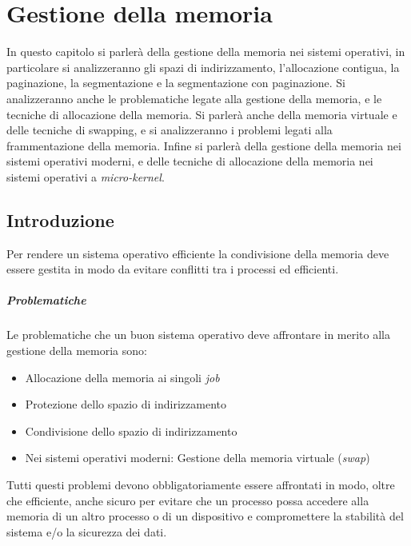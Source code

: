 \chapter{Gestione della memoria}

In questo capitolo si parlerà della gestione della memoria nei sistemi operativi, in particolare si analizzeranno gli spazi di indirizzamento, l'allocazione contigua, la paginazione, la segmentazione e la segmentazione con paginazione. Si analizzeranno anche le problematiche legate alla gestione della memoria, e le tecniche di allocazione della memoria. Si parlerà anche della memoria virtuale e delle tecniche di swapping, e si analizzeranno i problemi legati alla frammentazione della memoria. Infine si parlerà della gestione della memoria nei sistemi operativi moderni, e delle tecniche di allocazione della memoria nei sistemi operativi a \textit{micro-kernel}.

\section{Introduzione}
    Per rendere un sistema operativo efficiente la condivisione della memoria deve essere gestita in modo da evitare conflitti tra i processi ed efficienti.
    \paragraph{Problematiche}
        Le problematiche che un buon sistema operativo deve affrontare in merito alla gestione della memoria sono:
        \begin{itemize}
            \item Allocazione della memoria ai singoli \textit{job}
            \item Protezione dello spazio di indirizzamento
            \item Condivisione dello spazio di indirizzamento
            \item Nei sistemi operativi moderni: Gestione della memoria virtuale (\textit{swap})
        \end{itemize}
        Tutti questi problemi devono obbligatoriamente essere affrontati in modo, oltre che efficiente, anche sicuro per evitare che un processo possa accedere alla memoria di un altro processo o di un dispositivo e compromettere la stabilità del sistema e/o la sicurezza dei dati.
